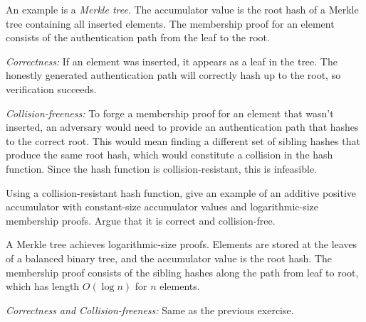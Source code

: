 \ifsolutions
\begin{mysolution}
  An example is a \emph{Merkle tree}.
  The accumulator value is the root hash of a Merkle tree containing all inserted elements.
  The membership proof for an element consists of the authentication path from the leaf to the root.
  
  \emph{Correctness:} If an element was inserted, it appears as a leaf in the tree.
  The honestly generated authentication path will correctly hash up to the root, so verification succeeds.
  
  \emph{Collision-freeness:} To forge a membership proof for an element that wasn't inserted, an adversary would need to provide an authentication path that hashes to the correct root.
  This would mean finding a different set of sibling hashes that produce the same root hash, which would constitute a collision in the hash function.
  Since the hash function is collision-resistant, this is infeasible.
\end{mysolution}
\fi

\begin{exercise}[Optional]
  Using a collision-resistant hash function, give an example of an additive positive accumulator with constant-size accumulator values and logarithmic-size membership proofs.
  Argue that it is correct and collision-free.
\end{exercise}

\ifsolutions
\begin{mysolution}
  A Merkle tree achieves logarithmic-size proofs.
  Elements are stored at the leaves of a balanced binary tree, and the accumulator value is the root hash.
  The membership proof consists of the sibling hashes along the path from leaf to root, which has length $O(\log n)$ for $n$ elements.

  \emph{Correctness and Collision-freeness:} Same as the previous exercise.
\end{mysolution}
\fi


